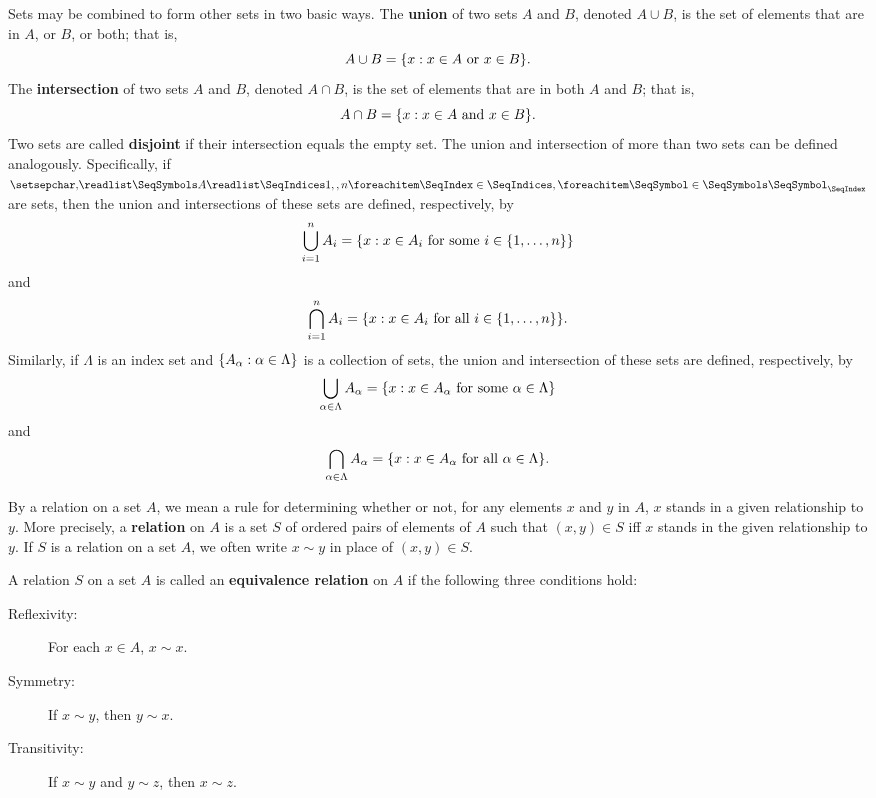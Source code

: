 \begin{defn}\label{a.0.5}
  Sets may be combined to form other sets in two basic ways.
  The \textbf{union} of two sets \(A\) and \(B\), denoted \(A \cup B\), is the set of elements that are in \(A\), or \(B\), or both;
  that is,
  \[
    A \cup B = \set{x : x \in A \text{ or } x \in B}.
  \]
  The \textbf{intersection} of two sets \(A\) and \(B\), denoted \(A \cap B\), is the set of elements that are in both \(A\) and \(B\);
  that is,
  \[
    A \cap B = \set{x : x \in A \text{ and } x \in B}.
  \]
  Two sets are called \textbf{disjoint} if their intersection equals the empty set.
  The union and intersection of more than two sets can be defined analogously.
  Specifically, if \(\seq{A}{1,,n}\) are sets, then the union and intersections of these sets are defined, respectively, by
  \[
    \bigcup_{i = 1}^n A_i = \left\lbrace x : x \in A_i \text{ for some } i \in \left\lbrace1, \dots, n\right\rbrace\right\rbrace
  \]
  and
  \[
    \bigcap_{i = 1}^n A_i = \set{x : x \in A_i \text{ for all } i \in \set{1, \dots, n}}.
  \]
  Similarly, if \(\Lambda\) is an index set and \(\left\lbrace A_{\alpha} : \alpha \in \Lambda\right\rbrace\) is a collection of sets, the union and intersection of these sets are defined, respectively, by
  \[
    \bigcup_{\alpha \in \Lambda} A_{\alpha} = \left\lbrace x : x \in A_{\alpha} \text{ for some } \alpha \in \Lambda\right\rbrace
  \]
  and
  \[
    \bigcap_{\alpha \in \Lambda} A_{\alpha} = \set{x : x \in A_{\alpha} \text{ for all } \alpha \in \Lambda}.
  \]
\end{defn}

\begin{defn}\label{a.0.6}
  By a relation on a set \(A\), we mean a rule for determining whether or not, for any elements \(x\) and \(y\) in \(A\), \(x\) stands in a given relationship to \(y\).
  More precisely, a \textbf{relation} on \(A\) is a set \(S\) of ordered pairs of elements of \(A\) such that \((x, y) \in S\) iff \(x\) stands in the given relationship to \(y\).
  If \(S\) is a relation on a set \(A\), we often write \(x \sim y\) in place of \((x, y) \in S\).
\end{defn}

\begin{defn}\label{a.0.7}
  A relation \(S\) on a set \(A\) is called an \textbf{equivalence relation} on \(A\) if the following three conditions hold:
  \begin{description}
    \item[Reflexivity:]
      For each \(x \in A\), \(x \sim x\).
    \item[Symmetry:]
      If \(x \sim y\), then \(y \sim x\).
    \item[Transitivity:]
      If \(x \sim y\) and \(y \sim z\), then \(x \sim z\).
  \end{description}
\end{defn}
